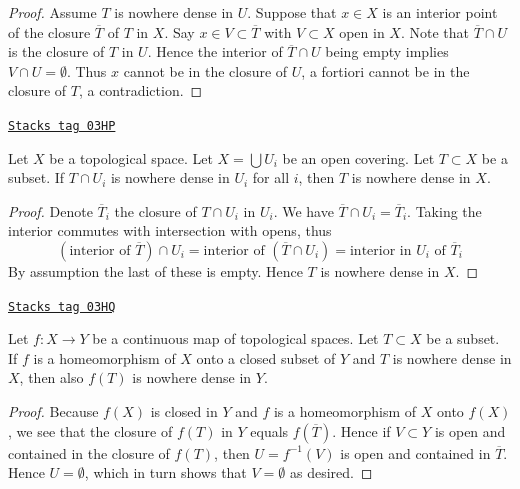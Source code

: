 \begin{proof}
Assume $T$ is nowhere dense in $U$.
Suppose that $x \in X$ is an interior point of the closure
$\overline{T}$ of $T$ in $X$. Say $x \in V \subset \overline{T}$
with $V \subset X$ open in $X$. Note that $\overline{T} \cap U$ is
the closure of $T$ in $U$. Hence the interior of $\overline{T} \cap U$
being empty implies $V \cap U = \emptyset$. Thus $x$ cannot be in the
closure of $U$, a fortiori cannot be in the closure of $T$, a contradiction.
\end{proof}

\begin{lemma}
\label{topology-lemma-nowhere-dense-local}
\href{https://stacks.math.columbia.edu/tag/03HP}{\texttt{Stacks tag 03HP}}

Let $X$ be a topological space.
Let $X = \bigcup U_i$ be an open covering.
Let $T \subset X$ be a subset.
If $T \cap U_i$ is nowhere dense in $U_i$ for all $i$,
then $T$ is nowhere dense in $X$.
\end{lemma}

\begin{proof}
Denote $\overline{T}_i$ the closure of $T \cap U_i$ in $U_i$.
We have $\overline{T} \cap U_i = \overline{T}_i$.
Taking the interior commutes with intersection with opens, thus
$$
(\text{interior of }\overline{T}) \cap U_i =
\text{interior of }(\overline{T} \cap U_i) =
\text{interior in }U_i\text{ of }\overline{T}_i
$$
By assumption the last of these is empty. Hence
$T$ is nowhere dense in $X$.
\end{proof}

\begin{lemma}
\label{topology-lemma-closed-image-nowhere-dense}
\href{https://stacks.math.columbia.edu/tag/03HQ}{\texttt{Stacks tag 03HQ}}

Let $f : X \to Y$ be a continuous map of topological spaces.
Let $T \subset X$ be a subset.
If $f$ is a homeomorphism of $X$ onto a closed subset of $Y$
and $T$ is nowhere dense in $X$, then also $f(T)$ is nowhere dense in $Y$.
\end{lemma}

\begin{proof}
Because $f(X)$ is closed in $Y$ and $f$ is a homeomorphism of $X$
onto $f(X)$, we see that the closure of $f(T)$ in $Y$ equals $f(\overline{T})$.
Hence if $V \subset Y$ is open and contained in the closure of $f(T)$,
then $U = f^{-1}(V)$ is open and contained in $\overline{T}$.
Hence $U = \emptyset$, which in turn shows that $V = \emptyset$
as desired.
\end{proof}

